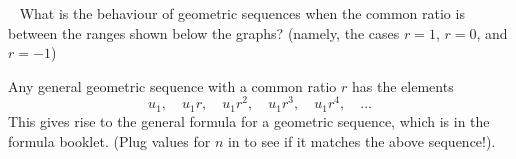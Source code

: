 \documentclass[../../main.tex]{subfiles}
\begin{document}
\begin{figure}[h]
    \centering
    \begin{subfigure}{0.49\textwidth}
    \end{subfigure}
    \begin{subfigure}{0.49\textwidth}
    \end{subfigure}
\end{figure}

\begin{thinking}{~}
    What is the behaviour of geometric sequences when the common ratio is between the ranges shown below the graphs? (namely, the cases \(r = 1\), \(r = 0\), and \(r = -1\))
\end{thinking}

Any general geometric sequence with a common ratio \(r\) has the elements
\[
    u_1,\quad u_1r,\quad u_1r^2,\quad u_1r^3,\quad u_1r^4,\quad \ldots
\]
This gives rise to the general formula for a geometric sequence, which is in the formula booklet. (Plug values for \(n\) in to see if it matches the above sequence!).

\end{document}
